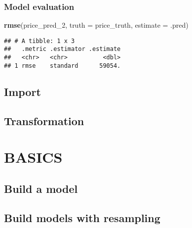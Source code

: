 \documentclass[
]{book}
\newenvironment{Shaded}{\begin{snugshade}}{\end{snugshade}}
\newcommand{\DataTypeTok}[1]{\textcolor[rgb]{0.13,0.29,0.53}{#1}}
\newcommand{\DecValTok}[1]{\textcolor[rgb]{0.00,0.00,0.81}{#1}}
\newcommand{\KeywordTok}[1]{\textcolor[rgb]{0.13,0.29,0.53}{\textbf{#1}}}
\newcommand{\NormalTok}[1]{#1}
\begin{document}
\hypertarget{model-evaluation-1}{%
\section{Model evaluation}\label{model-evaluation-1}}

\begin{Shaded}
\begin{Highlighting}[]
\KeywordTok{rmse}\NormalTok{(price\_pred\_}\DecValTok{2}\NormalTok{, }
     \DataTypeTok{truth =}\NormalTok{ price\_truth, }
     \DataTypeTok{estimate =}\NormalTok{ .pred)}
\end{Highlighting}
\end{Shaded}

\begin{verbatim}
## # A tibble: 1 x 3
##   .metric .estimator .estimate
##   <chr>   <chr>          <dbl>
## 1 rmse    standard      59054.
\end{verbatim}

\hypertarget{import}{%
\chapter{Import}\label{import}}

\hypertarget{transformation}{%
\chapter{Transformation}\label{transformation}}

\hypertarget{part-basics}{%
\part{BASICS}\label{part-basics}}

\hypertarget{model-building}{%
\chapter{Build a model}\label{model-building}}

\hypertarget{build-models-with-resampling}{%
\chapter{Build models with resampling}\label{build-models-with-resampling}}

  
\end{document}
